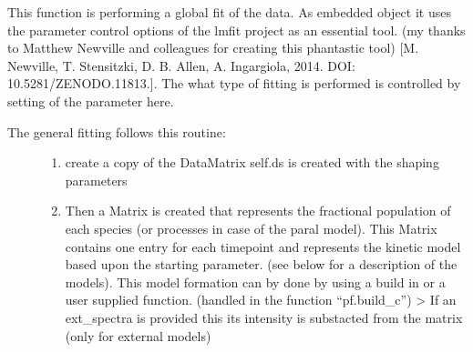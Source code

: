 \documentclass[letterpaper,10pt,english]{sphinxmanual}
\begin{document}
\begin{fulllineitems}
\begin{fulllineitems}
\end{fulllineitems}


\begin{fulllineitems}
\label{\detokenize{plot_func:plot_func.TA.Fit_Global}}
This function is performing a global fit of the data. As embedded object it uses
the parameter control options of the lmfit project as an essential tool.
(my thanks to Matthew Newville and colleagues for creating this phantastic tool)
{[}M. Newville, T. Stensitzki, D. B. Allen, A. Ingargiola, 2014. DOI: 10.5281/ZENODO.11813.{]}.
The what type of fitting is performed is controlled by setting of the parameter here.
\begin{description}
\item[{The general fitting follows this routine:}] \leavevmode\begin{enumerate}
%
\item {} 
create a copy of the Data\sphinxhyphen{}Matrix self.ds is created with the shaping parameters

\item {} 
Then a Matrix is created that represents the fractional population of each species
(or processes in case of the paral model).
This Matrix contains one entry for each timepoint and represents the kinetic model
based upon the starting parameter. (see below for a description of the models).
This model formation can by done by using a build in or a user supplied function.
(handled in the function “pf.build\_c”)
\sphinxhyphen{}\textgreater{} If an ext\_spectra is provided this its intensity is substacted from the matrix (only for external models)


\end{enumerate}
\end{description}
\end{fulllineitems}
\end{fulllineitems}
\end{document}

